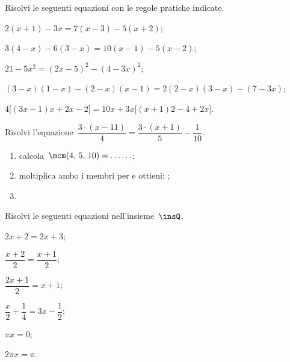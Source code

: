 \begin{esercizio}[\Ast] %
\label{ese:15.22}
Risolvi le seguenti equazioni con le regole pratiche indicate.
 \begin{enumeratea}
 \item $2(x+1)-3x=7(x-3)-5(x+2)$;
 \item $3(4-x)-6(3-x)=10(x-1)-5(x-2)$;
 \item $21-5x^{2}=(2x-5)^{2}-(4-3x)^{2}$;
 \item $(3-x)(1-x)-(2-x)(x-1)=2(2-x)(3-x)-(7-3x)$;
 \item $4\big[(3x-1)x+2x-2\big]=10x+3x\big[(x+1)2-4+2x\big]$.
 \end{enumeratea}
\end{esercizio}


\begin{esercizio}[\Ast]
\label{ese:15.23}
Risolvi l'equazione~$\dfrac{3\cdot (x-11)}{4}=\dfrac{3\cdot (x+1)}{5}-\dfrac{1}{10}$.
\begin{enumerate}
 \item calcola~$\mcm(4\text{,~}5\text{,~}10) = \ldots \ldots$;
 \item moltiplica ambo i membri per \dotfill e ottieni: \dotfill;
 \item \dotfill
\end{enumerate}
\end{esercizio}

\begin{esercizio}
\label{ese:15.24}
Risolvi le seguenti equazioni nell'insieme~$\insQ$.
\begin{multicols}{3}
\begin{enumeratea}
 \item $2x+2=2x+3$;
 \item $\dfrac{x+2}{2}=\dfrac{x+1}{2}$;
 \item $\dfrac{2x+1}{2}=x+1$;
 \item $\dfrac{x}{2}+\dfrac{1}{4}=3x-\dfrac{1}{2}$;
 \item $\pi x=0$;
 \item $2\pi x=\pi$.
\end{enumeratea}
\end{multicols}
\end{esercizio}

